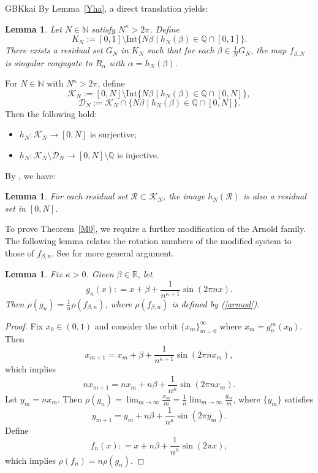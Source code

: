 \documentclass{amsart}
\newcommand{\R}{\mathbb{R}}
\newcommand{\ka}{\kappa}
\newtheorem{Lemma}[Definition]{Lemma}
\theoremstyle{definition}
\begin{document}
\begin{CJK*}{GBK}{kai}
By Lemma~\ref{Yha}, a direct translation yields:

\begin{Lemma}\label{Yhax}
Let $N \in \mathbb{N}$ satisfy $N^{\kappa} > 2\pi$. Define
\[
K_N := [0,1] \setminus \mathrm{Int}\{N\beta \mid h_N(\beta) \in \mathbb{Q} \cap [0,1]\}.
\]
There exists a residual set $G_N$ in $K_N$ such that for each $\beta \in \frac{1}{N} G_N$, the map $f_{\beta,N}$ is singular conjugate to $R_{\alpha}$ with $\alpha = h_N(\beta)$.
\end{Lemma}

For $N \in \mathbb{N}$ with $N^{\kappa} > 2\pi$, define
\[
\mathcal{K}_N := [0, N] \setminus \mathrm{Int}\{N\beta \mid h_N(\beta) \in \mathbb{Q} \cap [0,N]\},
\]
\[
\mathcal{D}_N := \mathcal{K}_N \cap \{N\beta \mid h_N(\beta) \in \mathbb{Q} \cap [0,N]\}.
\]
Then the following hold:
\begin{itemize}
\item $h_N: \mathcal{K}_N \to [0, N]$ is surjective;
\item $h_N: \mathcal{K}_N \setminus \mathcal{D}_N \to [0, N] \setminus \mathbb{Q}$ is injective.
\end{itemize}

By \cite[Page 38, Prop. 5.3(b)]{H11}, we have:

\begin{Lemma}\label{Yhamdx}
For each residual set $\mathcal{R} \subset \mathcal{K}_N$, the image $h_N(\mathcal{R})$ is also a residual set in $[0, N]$.
\end{Lemma}

To prove Theorem~\ref{M0}, we require a further modification of the Arnold family. The following lemma relates the rotation numbers of the modified system to those of $f_{\beta,n}$. See \cite[Chapter XI.2]{H11} for more general argument.

\begin{Lemma}\label{Yro}
Fix $\ka>0$. Given $\beta\in\R$, let
\[
g_{n}(x): = x + \beta + \frac{1}{n^{\ka+1}} \sin(2\pi n x).
\]
Then  \( \rho(g_{n}) = \frac{1}{n} \rho(f_{\beta,n}) \), where $\rho(f_{\beta,n}) $ is defined by (\ref{armod}).
\end{Lemma}

\begin{proof}

	Fix \( x_0 \in (0,1) \) and consider the orbit \( \{x_m\}_{m=0}^{\infty} \) where \( x_m = g_{n}^m(x_0) \). Then
\[
x_{m+1} = x_m + \beta + \frac{1}{n^{\ka+1}} \sin(2\pi n x_m),
\]
which implies
\[
n x_{m+1} = n x_m + n\beta + \frac{1}{n^{\ka}} \sin(2\pi n x_m).
\]
Let \( y_m = n x_m \). Then \( \rho(g_{n}) = \lim_{m\to\infty} \frac{x_m}{m} = \frac{1}{n} \lim_{m\to\infty} \frac{y_m}{m} \), where \( \{y_m\} \) satisfies
\[
y_{m+1} = y_m + n\beta + \frac{1}{n^{\ka}} \sin(2\pi y_m).
\]
Define
\begin{equation}\label{fbex}
f_{n}(x): = x + n\beta + \frac{1}{n^{\ka}} \sin(2\pi x),
\end{equation}
which implies
\( \rho(f_{n}) = n \rho(g_{n}) \).	
	\end{proof}	
		


\end{CJK*}
\end{document}

